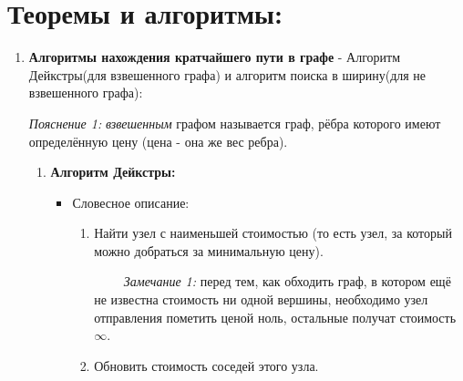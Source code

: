 \documentclass[a4paper,12pt]{article}
\begin{document}
    \section{Теоремы и алгоритмы:}
        \begin{enumerate}
            \item \textbf{Алгоритмы нахождения кратчайшего пути в графе} - Алгоритм Дейкстры(для взвешенного графа) и алгоритм поиска в ширину(для не взвешенного графа):
        
            \textit{Пояснение 1:} \textit{взвешенным} графом называется граф, рёбра которого имеют определённую цену (цена - она же вес ребра).
            \begin{enumerate}
                \item \textbf{Алгоритм Дейкстры:}
                    \begin{itemize}
                        \item Словесное описание:
                        \begin{enumerate}
                            \item Найти узел с наименьшей стоимостью (то есть узел, за который можно добраться за минимальную цену).
                            
                            $\qquad$ \textit{Замечание 1:} перед тем, как обходить граф, в котором ещё не известна стоимость ни одной вершины, необходимо узел отправления пометить ценой ноль, остальные получат стоимость $\infty$. 
                            \item Обновить стоимость соседей этого узла.
                            

\end{enumerate}
\end{itemize}
\end{enumerate}
\end{enumerate}
\end{document}
